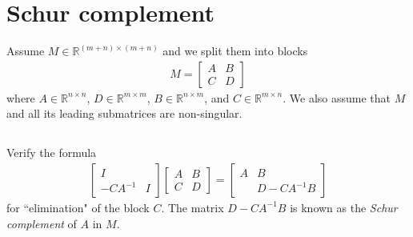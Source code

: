 \documentclass{article}%
\begin{document}
\section{Schur complement}
Assume $M\in \mathbb{R}^{(m+n)\times(m+n)}$ and we split them into blocks
\begin{align*}
    M = \begin{bmatrix}
    A &B\\
    C &D
    \end{bmatrix}
\end{align*}
where $A\in\mathbb{R}^{n\times n}$, $D\in\mathbb{R}^{m\times m}$, $B\in\mathbb{R}^{n\times m}$, and $C\in\mathbb{R}^{m\times n}$. We also assume that $M$ and all its leading submatrices are non-singular. 

\subsection{}
Verify the formula
\begin{align*}
     \begin{bmatrix}
    I & \\
    -CA^{-1} & I
    \end{bmatrix} \begin{bmatrix}
    A &B\\
    C &D
    \end{bmatrix} =  \begin{bmatrix}
    A &B\\
     &D-CA^{-1}B
    \end{bmatrix}
\end{align*}
for ``elimination" of the block $C$. The matrix $D-CA^{-1}B$ is  known as the \textit{Schur complement} of $A$ in $M$.
\end{document}
